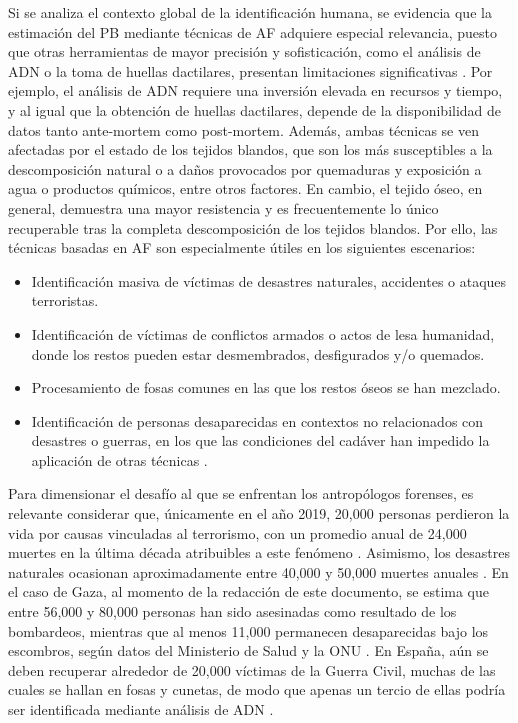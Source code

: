 Si se analiza el contexto global de la identificación humana, se evidencia que la estimación del PB mediante técnicas de AF adquiere especial relevancia, puesto que otras herramientas de mayor precisión y sofisticación, como el análisis de ADN o la toma de huellas dactilares, presentan limitaciones significativas \cite{de_boer_role_2019, beauthier_mass_2009}. Por ejemplo, el análisis de ADN requiere una inversión elevada en recursos y tiempo, y al igual que la obtención de huellas dactilares, depende de la disponibilidad de datos tanto ante-mortem como post-mortem. Además, ambas técnicas se ven afectadas por el estado de los tejidos blandos, que son los más susceptibles a la descomposición natural o a daños provocados por quemaduras y exposición a agua o productos químicos, entre otros factores. En cambio, el tejido óseo, en general, demuestra una mayor resistencia y es frecuentemente lo único recuperable tras la completa descomposición de los tejidos blandos. Por ello, las técnicas basadas en AF son especialmente útiles en los siguientes escenarios:

\begin{itemize}
    \item Identificación masiva de víctimas de desastres naturales, accidentes o ataques terroristas.
    \item Identificación de víctimas de conflictos armados o actos de lesa humanidad, donde los restos pueden estar desmembrados, desfigurados y/o quemados.
    \item Procesamiento de fosas comunes en las que los restos óseos se han mezclado.
    \item Identificación de personas desaparecidas en contextos no relacionados con desastres o guerras, en los que las condiciones del cadáver han impedido la aplicación de otras técnicas \cite{byers_introduction_2016}.
\end{itemize}

Para dimensionar el desafío al que se enfrentan los antropólogos forenses, es relevante considerar que, únicamente en el año 2019, 20,000 personas perdieron la vida por causas vinculadas al terrorismo, con un promedio anual de 24,000 muertes en la última década atribuibles a este fenómeno \cite{owid_terrorism}. Asimismo, los desastres naturales ocasionan aproximadamente entre 40,000 y 50,000 muertes anuales \cite{owid_natural_disasters}. En el caso de Gaza, al momento de la redacción de este documento, se estima que entre 56,000 y 80,000 personas han sido asesinadas como resultado de los bombardeos, mientras que al menos 11,000 permanecen desaparecidas bajo los escombros, según datos del Ministerio de Salud y la ONU \cite{morales_56000_2025}. En España, aún se deben recuperar alrededor de 20,000 víctimas de la Guerra Civil, muchas de las cuales se hallan en fosas y cunetas, de modo que apenas un tercio de ellas podría ser identificada mediante análisis de ADN \cite{junquera_huellas_2022}.

